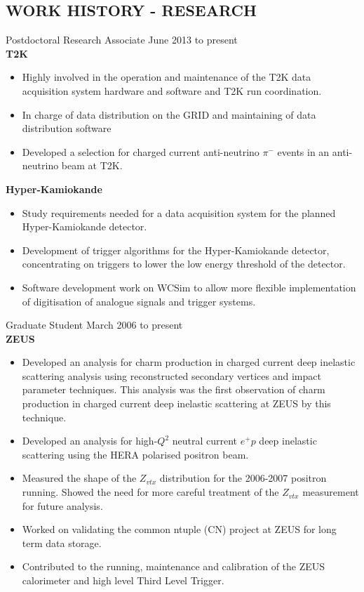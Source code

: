 \documentclass[margin]{res}
\begin{document}
\begin{resume}
\section{WORK HISTORY - RESEARCH}
Postdoctoral Research Associate \hfill June 2013 to present\\
\textbf{T2K}
\begin{itemize}
\item Highly involved in the operation and maintenance of the T2K data acquisition system hardware and software and T2K run coordination.
\item In charge of data distribution on the GRID and maintaining of data distribution software
\item Developed a selection for charged current anti-neutrino $\pi^{-}$ events in an anti-neutrino beam at T2K.
\end{itemize}
\textbf{Hyper-Kamiokande}
\begin{itemize}
\item Study requirements needed for a data acquisition system for the planned Hyper-Kamiokande detector.
\item Development of trigger algorithms for the Hyper-Kamiokande detector, concentrating on triggers to lower the low energy threshold of the detector.
\item Software development work on WCSim to allow more flexible implementation of digitisation of analogue signals and trigger systems.
\end{itemize}
Graduate Student \hfill March 2006 to present\\
\textbf{ZEUS}
\begin{itemize}
\item Developed an analysis for charm production in charged current deep inelastic scattering analysis using reconstructed secondary vertices and impact parameter techniques.  This analysis was the first observation of charm production in charged current deep inelastic scattering at ZEUS by this technique.
\item Developed an analysis for high-$Q^2$ neutral current $e^{+}p $ deep inelastic scattering using the HERA polarised positron beam. 
\item Measured the shape of the $Z_{vtx}$ distribution for the 2006-2007 positron running.  Showed the need for more careful treatment of the $Z_{vtx}$ measurement for future analysis.
\item Worked on validating the common ntuple (CN) project at ZEUS for long term data storage.
\item Contributed to the running, maintenance and calibration of the ZEUS calorimeter and high level Third Level Trigger. 

\end{itemize}
\end{resume}
\end{document}
